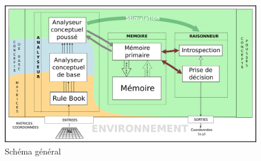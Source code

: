 \begin{figure}[H] 
\includegraphics[width=\textwidth]{files/simplified_general_diagram} 
\caption{Schéma général} 
\end{figure}
